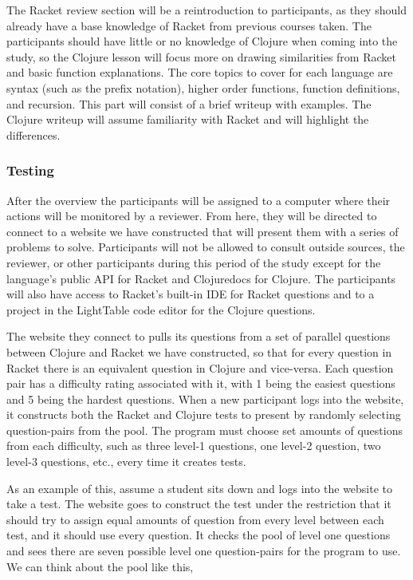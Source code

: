\documentclass[submission,copyright,creativecommons]{eptcs}
\begin{document}
The Racket review section will be a reintroduction to participants, as they should already have a base knowledge of Racket from previous courses taken.
The participants should have little or no knowledge of Clojure when coming into the study, so the Clojure lesson will focus more on drawing similarities from Racket and basic function explanations.
The core topics to cover for each language are syntax (such as the prefix notation), higher order functions, function definitions, and recursion.
This part will consist of a brief writeup with examples. The Clojure writeup will assume familiarity with Racket and will highlight the differences. 

\subsubsection{Testing}\label{subsec:testing}

After the overview the participants will be assigned to a computer where their actions will be monitored by a reviewer. 
From here, they will be directed to connect to a website we have constructed that will present them with a series of problems to solve. 
Participants will not be allowed to consult outside sources, the reviewer, or other participants during this period of the study except for the language's public API for Racket and Clojuredocs for Clojure.
The participants will also have access to Racket's built-in IDE for Racket questions and to a project in the LightTable code editor for the Clojure questions. 

The website they connect to pulls its questions from a set of parallel questions between Clojure and Racket we have constructed, so that for every question in Racket there is an equivalent question in Clojure and vice-versa.
Each question pair has a difficulty rating associated with it, with 1 being the easiest questions and 5 being the hardest questions.
When a new participant logs into the website, it constructs both the Racket and Clojure tests to present by randomly selecting question-pairs from the pool. 
The program must choose set amounts of questions from each difficulty, such as three level-1 questions, one level-2 question, two level-3 questions, etc., every time it creates tests. 

As an example of this, assume a student sits down and logs into the website to take a test.
The website goes to construct the test under the restriction that it should try to assign equal amounts of question from every level between each test, and it should use every question. 
It checks the pool of level one questions and sees there are seven possible level one question-pairs for the program to use.
We can think about the pool like this,
\end{document}
